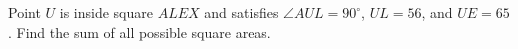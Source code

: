 Point $U$ is inside square $ALEX$ and satisfies $\angle AUL=90^\circ$, $UL=56$, and $UE=65$. Find the sum of all possible square areas.
